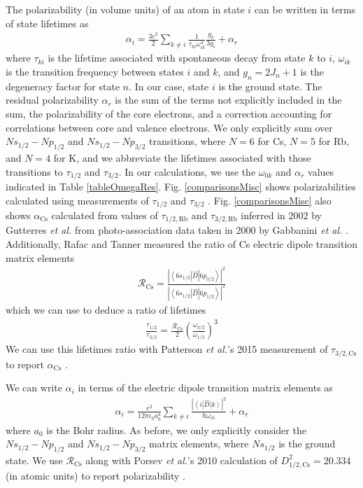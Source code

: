 \documentclass[twocolumn,prl,showpacs,superscriptaddress]{revtex4-1}   %
\newcommand{\brakett}[3]{\left\langle #1 \right|#2\left| #3 \right\rangle}
\newcommand{\figref}[1]{Fig. \ref{#1}}
\newcommand{\acs}{\alpha_{\textrm{Cs}}}
\newcommand{\rcs}{\mathcal{R}_{\mathrm{Cs}}}
\newcommand{\etal}{\textit{et al.}}
\newcommand{\etalspace}{\textit{et al. }}
\begin{document}
The polarizability (in volume units) of an atom in state $i$ can be written in terms of state lifetimes as
\begin{align}
	\alpha_i = \frac{3c^3}{2} \sum_{k\neq i} 
	\frac{1}{\tau_{ki} \omega_{ik}^4} \frac{g_k}{3g_i}
	+ \alpha_r
	\label{polFromLifetimes}
\end{align}
where $\tau_{ki}$ is the lifetime associated with spontaneous decay from state $k$ to $i$, $\omega_{ik}$ is the transition frequency between states $i$ and $k$, and $g_n = 2J_n+1$ is the degeneracy factor for state $n$. In our case, state $i$ is the ground state. 
The residual polarizability $\alpha_r$ is the sum of the terms not explicitly included in the sum, the polarizability of the core electrons, and a correction accounting for correlations between core and valence electrons.
We only explicitly sum over $Ns_{1/2}-Np_{1/2}$ and $Ns_{1/2}-Np_{3/2}$ transitions, where $N=6$ for Cs, $N=5$ for Rb, and $N=4$ for K, and we abbreviate the lifetimes associated with those transitions to $\tau_{1/2}$ and $\tau_{3/2}$.
In our calculations, we use the $\omega_{0k}$ and $\alpha_r$ values indicated in Table \ref{tableOmegaRes}.
\figref{comparisonsMisc} shows polarizabilities calculated using measurements of $\tau_{1/2}$ and $\tau_{3/2}$
\cite{Young1994,Rafac1999,Bouloufa2007,Falke2006a,Volz2006,Simsarian1998,Wang1997}.
\figref{comparisonsMisc} also shows $\acs$ calculated from 
values of $\tau_{1/2,\mathrm{Rb}}$ and $\tau_{3/2,\mathrm{Rb}}$ inferred in 2002 by Gutterres \etalspace from photo-association data taken in 2000 by Gabbanini \etalspace \cite{Gabbanini2000,Gutterres2002}.
Additionally, Rafac and Tanner measured the ratio of Cs electric dipole transition matrix elements \cite{Rafac1998}
\begin{align}
	\rcs = \frac
	{\left|\brakett{6s_{1/2}}{\hat{D}}{6p_{3/2}}\right|^2}
	{\left|\brakett{6s_{1/2}}{\hat{D}}{6p_{1/2}}\right|^2}
	\label{polFromLifetimes}
\end{align}
which we can use to deduce a ratio of lifetimes
\begin{align}
	\frac{\tau_{1/2}}{\tau_{3/2}} = \frac{\rcs}{2} \left( \frac{\omega_{3/2}}{\omega_{1/2}} \right)^3
	\label{RafacRLifetimes}
\end{align}
We can use this lifetimes ratio with Patterson \etal's 2015 measurement of $\tau_{3/2,\mathrm{Cs}}$ to report $\acs$ \cite{Patterson2015}.

We can write $\alpha_i$ in terms of the electric dipole transition matrix elements as
\begin{align}
	\alpha_i = \frac{e^2}{12 \pi \epsilon_0 a_0^4} \sum_{k\neq i}	
	\frac{\left|\brakett{i}{\hat{D}}{k}\right|^2}{\hbar\omega_{ik}}	
	+ \alpha_r
	\label{polFromMatrixElements}
\end{align}
where $a_0$ is the Bohr radius. 
As before, we only explicitly consider the $Ns_{1/2}-Np_{1/2}$ and $Ns_{1/2}-Np_{3/2}$ matrix elements, 
where $Ns_{1/2}$ is the ground state.
We use $\rcs$ along with Porsev \etal's 2010 calculation of $D_{1/2,\mathrm{Cs}}^2 = 20.334$ (in atomic units) to report polarizability \cite{Rafac1998,Porsev2010}.
\end{document}

